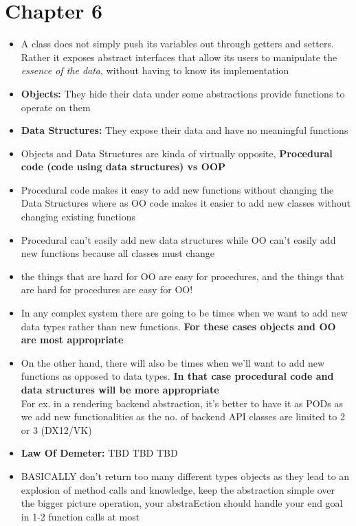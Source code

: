 \documentclass[14pt]{article}
\begin{document}
\section*{Chapter 6}
\begin{itemize}

	\item A class does not simply push its variables out through getters and setters. Rather it exposes abstract interfaces that allow its users to manipulate the \textit{essence of the data}, without having to know its implementation
	\item \textbf{Objects:} They hide their data under some abstractions provide functions to operate on them
	\item \textbf{Data Structures:} They expose their data and have no meaningful functions
	\item Objects and Data Structures are kinda of virtually opposite, \textbf{Procedural code (code using data structures) vs OOP}
	\item Procedural code makes it easy to add new functions without changing the Data Structures where as OO code makes it easier to add new classes without changing existing functions
	\item Procedural can't easily add new data structures while OO can't easily add new functions because all classes must change
	\item the things that are hard for OO are easy for procedures, and the things that are hard for procedures are easy for OO!
	\item In any complex system there are going to be times when we want to add new data types rather than new functions. \textbf{For these cases objects and OO are most appropriate}
	\item On the other hand, there will also be times when we’ll want to add new functions as opposed to data types. \textbf{In that case procedural code and data structures will be more appropriate} \\ For ex. in a rendering backend abstraction, it's better to have it as PODs as we add new functionalities as the no. of backend API classes are limited to 2 or 3 (DX12/VK)
	\item \textbf{Law Of Demeter:} TBD TBD TBD
	\item BASICALLY don't return too many different types objects as they lead to an explosion of method calls and knowledge, keep the abstraction simple over the bigger picture operation, your abstraEction should handle your end goal in 1-2 function calls at most

\end{itemize}
\end{document}

